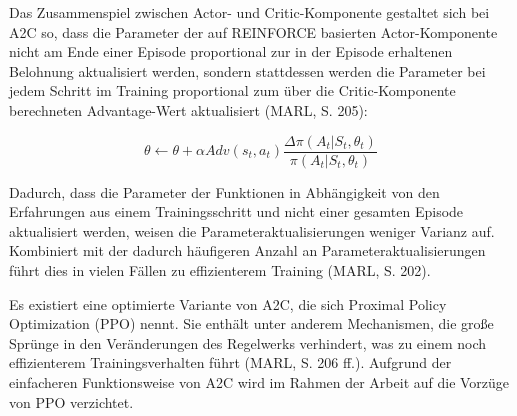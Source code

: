 Das Zusammenspiel zwischen Actor- und Critic-Komponente gestaltet sich bei A2C so, dass die Parameter der auf REINFORCE basierten Actor-Komponente nicht am Ende einer Episode proportional zur in der Episode erhaltenen Belohnung aktualisiert werden, sondern stattdessen werden die Parameter bei jedem Schritt im Training proportional zum über die Critic-Komponente berechneten Advantage-Wert aktualisiert (MARL, S. 205):

\[ \theta \leftarrow \theta + \alpha Adv(s_t, a_t) \frac{\Delta \pi (A_t|S_t, \theta_t)}{\pi (A_t|S_t, \theta_t)} \]

Dadurch, dass die Parameter der Funktionen in Abhängigkeit von den Erfahrungen aus einem Trainingsschritt und nicht einer gesamten Episode aktualisiert werden, weisen die Parameteraktualisierungen weniger Varianz auf. Kombiniert mit der dadurch häufigeren Anzahl an Parameteraktualisierungen führt dies in vielen Fällen zu effizienterem Training (MARL, S. 202).

Es existiert eine optimierte Variante von A2C, die sich Proximal Policy Optimization (PPO) nennt. Sie enthält unter anderem Mechanismen, die große Sprünge in den Veränderungen des Regelwerks verhindert, was zu einem noch effizienterem Trainingsverhalten führt (MARL, S. 206 ff.). Aufgrund der einfacheren Funktionsweise von A2C wird im Rahmen der Arbeit auf die Vorzüge von PPO verzichtet.
